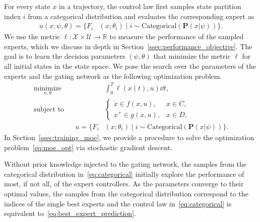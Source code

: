 For every state $x$ in a trajectory, the control law first samples state
partition index $i$ from a categorical distribution and evaluates the
corresponding expert as
\begin{align}
    u(x; \psi, \theta) = \{F_i&(x; \theta_i) \; | \; i  \sim \text{Categorical} (\mathbf{P}(x| \psi)) \}.
    \label{eq:categorical}
\end{align} 
%
We use the metric $\ell : \mathcal{X} \times \mathcal{U} \rightarrow
\mathbb{R}$ to measure the performance of the sampled experts, which we discuss
in depth in Section~\ref{ssec:performance_objective}.
%
%
The goal is to learn the decision parameters $(\psi, \theta)$ that minimize the
metric $\ell$ for all initial states in the state space.
%
We pose the search over the parameters of the experts and the gating network as the following optimization problem.
\begin{equation}
    \begin{aligned}
        \underset{\psi, \theta}{\textrm{minimize}} 
        & & &\int_0^T \ell (x(t),u) \dd t , \\%
        \textrm{subject to}
        & & &\begin{cases}
                    \dot{x} \in f(x, u), & x \in C,\\
                    x^+ \in g(x, u), & x \in D,
                \end{cases}\\%
        & & u = \{F_i&(x; \theta_i) \; | \; i  \sim \text{Categorical} (\mathbf{P}(x| \psi)) \}.
    \end{aligned}
    \label{eq:moe_opt}
\end{equation}
%
In Section~\ref{ssec:training_moe}, we provide a procedure to solve the
optimization problem~\eqref{eq:moe_opt} via stochastic gradient descent. 
\begin{rem}
    Without prior knowledge injected to the gating network, the samples from the
    categorical distribution in~\eqref{eq:categorical} initially explore the
    performance of most, if not all, of the expert controllers.
    As the parameters converge to their optimal values, the samples from the
    categorical distribution correspond to the indices of the single best
    experts and the control law in~\eqref{eq:categorical} is equivalent
    to~\eqref{eq:best_expert_prediction}.
\end{rem}

